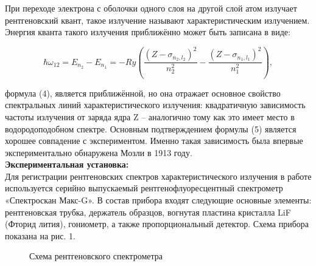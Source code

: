 \documentclass[a4paper, 12pt]{article}%
\begin{document}
	
	При переходе электрона с оболочки одного слоя на другой слой атом
	излучает рентгеновский квант, такое излучение называют характеристическим излучением. Энергия кванта такого излучения приближённо
	может быть записана в виде:
	
	\begin{equation}
		\hbar \omega_{12}=E_{n_2}-E_{n_1}=-R y\left(\frac{\left(Z-\sigma_{n_2, l_2}\right)^2}{n_2^2}-\frac{\left(Z-\sigma_{n_1, l_1}\right)^2}{n_1^2}\right),
	\end{equation}

	формула (4), является приближённой,
	но она отражает основное свойство спектральных линий характеристического излучения: квадратичную зависимость частоты излучения от заряда ядра Z – аналогично тому как это имеет место в водородоподобном спектре. Основным подтверждением формулы (5) является
	хорошее совпадение с экспериментом. Именно такая зависимость
	была впервые экспериментально обнаружена Мозли в 1913 году.\\
	
	
	\textbf{Экспериментальная установка: }\\
	
	Для регистрации рентгеновских спектров характеристического излучения в работе используется серийно выпускаемый рентгенофлуоресцентный спектрометр «Спектроскан Макс-G». В состав прибора входят следующие основные элементы: рентгеновская трубка, держатель образцов,
	вогнутая пластина кристалла LiF (Фторид лития), гониометр, а также пропорциональный детектор. Схема прибора показана на рис. 1.
	
	\begin{figure}[H]
		\caption{Схема рентгеновского спектрометра}
	\end{figure}
	
\end{document}
